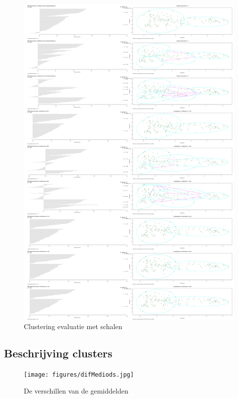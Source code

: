 \documentclass[a4paper,kulak]{kulakarticle}
\begin{document}
\begin{figure}[H]
	\centering
	\includegraphics[height=\textheight]{figures/clusteringEvaluationScaled.jpg}
	\caption{Clustering evaluatie met schalen}
	\label{fig:ce}
\end{figure}

 \subsection{Beschrijving clusters}

\begin{figure}[H]
	\centering
	\texttt{[image: figures/difMediods.jpg]}
	\caption{De verschillen van de gemiddelden}
	\label{fig:dm}
\end{figure}

 
\end{document}
